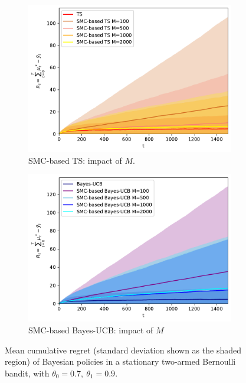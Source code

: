 \begin{figure}[!h]
	\begin{subfigure}[b]{0.46\textwidth}
		\centering
		\includegraphics[width=\textwidth]{./fods_figs/static/bernoulli/A2/theta0.7_0.9_allM_cumulative_regret_ts}
		\caption{SMC-based TS: impact of $M$.}
	\end{subfigure}
	\begin{subfigure}[b]{0.46\textwidth}
		\centering
		\includegraphics[width=\textwidth]{./fods_figs/static/bernoulli/A2/theta0.7_0.9_allM_cumulative_regret_bucb}
		\caption{SMC-based Bayes-UCB: impact of $M$}
	\end{subfigure}
	
	\caption{Mean cumulative regret (standard deviation shown as the shaded region) of Bayesian policies in a stationary two-armed Bernoulli bandit, with $\theta_0=0.7, \ \theta_1=0.9$.}
\end{figure}

